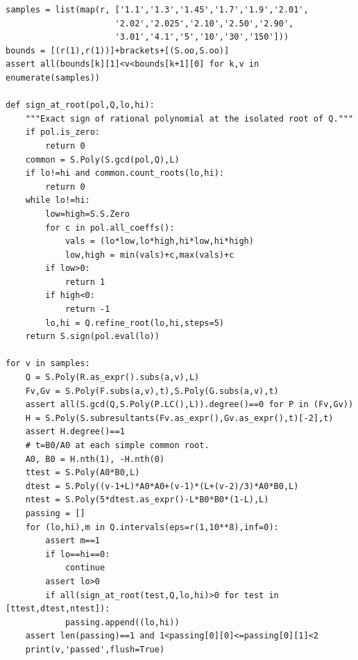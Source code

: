 \documentclass[11pt]{article}
\begin{document}
\begin{verbatim}
samples = list(map(r, ['1.1','1.3','1.45','1.7','1.9','2.01',
                      '2.02','2.025','2.10','2.50','2.90',
                      '3.01','4.1','5','10','30','150']))
bounds = [(r(1),r(1))]+brackets+[(S.oo,S.oo)]
assert all(bounds[k][1]<v<bounds[k+1][0] for k,v in enumerate(samples))

def sign_at_root(pol,Q,lo,hi):
    """Exact sign of rational polynomial at the isolated root of Q."""
    if pol.is_zero:
        return 0
    common = S.Poly(S.gcd(pol,Q),L)
    if lo!=hi and common.count_roots(lo,hi):
        return 0
    while lo!=hi:
        low=high=S.S.Zero
        for c in pol.all_coeffs():
            vals = (lo*low,lo*high,hi*low,hi*high)
            low,high = min(vals)+c,max(vals)+c
        if low>0:
            return 1
        if high<0:
            return -1
        lo,hi = Q.refine_root(lo,hi,steps=5)
    return S.sign(pol.eval(lo))

for v in samples:
    Q = S.Poly(R.as_expr().subs(a,v),L)
    Fv,Gv = S.Poly(F.subs(a,v),t),S.Poly(G.subs(a,v),t)
    assert all(S.gcd(Q,S.Poly(P.LC(),L)).degree()==0 for P in (Fv,Gv))
    H = S.Poly(S.subresultants(Fv.as_expr(),Gv.as_expr(),t)[-2],t)
    assert H.degree()==1
    # t=B0/A0 at each simple common root.
    A0, B0 = H.nth(1), -H.nth(0)
    ttest = S.Poly(A0*B0,L)
    dtest = S.Poly((v-1+L)*A0*A0+(v-1)*(L+(v-2)/3)*A0*B0,L)
    ntest = S.Poly(5*dtest.as_expr()-L*B0*B0*(1-L),L)
    passing = []
    for (lo,hi),m in Q.intervals(eps=r(1,10**8),inf=0):
        assert m==1
        if lo==hi==0:
            continue
        assert lo>0
        if all(sign_at_root(test,Q,lo,hi)>0 for test in [ttest,dtest,ntest]):
            passing.append((lo,hi))
    assert len(passing)==1 and 1<passing[0][0]<=passing[0][1]<2
    print(v,'passed',flush=True)
\end{verbatim}
\end{document}
